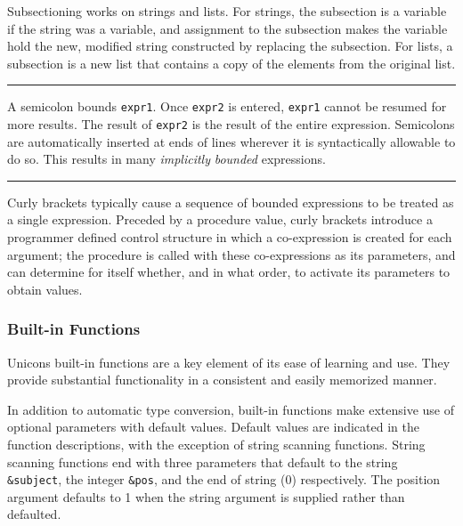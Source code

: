Subsectioning works on strings and lists. For strings, the subsection is
a variable if the string was a variable, and
assignment to the subsection makes the
variable hold the new, modified string constructed by replacing the subsection.
For lists, a subsection is a new
list that contains a copy of the elements from the original list.

\bigskip\hrule\vspace{0.1cm}

\noindent
A semicolon bounds \texttt{expr1}. Once \texttt{expr2} is entered,
\texttt{expr1} cannot be resumed for more results. The result of
\texttt{expr2} is the result of the entire expression. Semicolons are automatically inserted at ends of lines
wherever it is syntactically allowable to do so. This results in many
\textit{implicitly }\textit{bounded}
expressions.

\bigskip\hrule\vspace{0.1cm}


\noindent
Curly brackets typically cause a sequence
of bounded expressions to be treated as a single expression. Preceded
by a procedure value, curly brackets introduce a programmer defined
control structure in which a co-expression is created for each
argument; the procedure is called with these co-expressions as its
parameters, and can determine for itself whether, and in what order, to
activate its parameters to obtain values.

\subsubsection{Built-in Functions}

Unicon{\textquotesingle}s built-in functions
are a key element of its ease of learning and use. They provide
substantial functionality in a consistent and easily memorized manner.

In addition to automatic type conversion, built-in functions make
extensive use of optional parameters with default values. Default
values are indicated in the function descriptions, with the exception
of string scanning functions. String scanning functions end with three parameters that
default to the string \texttt{\&subject}, the integer \texttt{\&pos},
and the end of string (0) respectively. The position argument defaults
to 1 when the string argument is supplied rather than defaulted.

